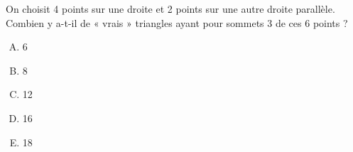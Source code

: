 On choisit 4 points sur une droite et 2 points sur une autre droite parallèle.
Combien y a-t-il de « vrais » triangles ayant pour sommets 3 de ces 6
points ?
\begin{multicols}{5}
  \begin{enumerate}[A)]
  \item 6
  \item 8
  \item 12
  \item 16
  \item 18
  \end{enumerate}
\end{multicols}
